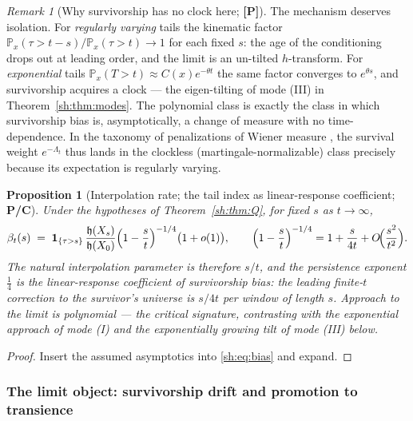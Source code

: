 \documentclass[11pt]{article}
\numberwithin{equation}{section}
\theoremstyle{plain}
\newtheorem{proposition}[theorem]{Proposition}
\theoremstyle{definition}
\theoremstyle{remark}
\newtheorem{remark}[theorem]{Remark}
\newcommand{\PP}{\mathbb{P}}
\newcommand{\one}{\mathbf{1}}
\newcommand{\hm}{\mathfrak{h}}
\begin{document}
\begin{remark}[Why survivorship has no clock here; \textbf{[P]}]
\label{sh:rem:noclock}
The mechanism deserves isolation. For \emph{regularly varying} tails the
kinematic factor $\PP_x(\tau>t-s)/\PP_x(\tau>t)\to1$ for each fixed $s$:
the age of the conditioning drops out at leading order, and the limit is
an un-tilted $h$-transform. For \emph{exponential} tails
$\PP_x(T>t)\approx C(x)e^{-\theta t}$ the same factor converges to
$e^{\theta s}$, and survivorship acquires a clock --- the eigen-tilting
of mode (III) in Theorem~\ref{sh:thm:modes}. The polynomial class is
exactly the class in which survivorship bias is, asymptotically, a
change of measure with no time-dependence. In the taxonomy of
penalizations of Wiener measure \cite{RVY06}, the survival weight
$e^{-\Lambda_t}$ thus lands in the clockless (martingale-normalizable)
class precisely because its expectation is regularly varying.
\end{remark}

\begin{proposition}[Interpolation rate; the tail index as linear-response
coefficient; \textbf{P/C}]\label{sh:prop:rate}
Under the hypotheses of Theorem~\ref{sh:thm:Q}, for fixed $s$ as
$t\to\infty$,
\begin{equation}\label{sh:eq:rate-interp}
\beta_t(s)\;=\;\one_{\{\tau>s\}}\,\frac{\hm(X_s)}{\hm(X_0)}
\Bigl(1-\frac st\Bigr)^{-1/4}\bigl(1+o(1)\bigr),
\qquad
\Bigl(1-\frac st\Bigr)^{-1/4}=1+\frac{s}{4t}+O\!\Bigl(\frac{s^2}{t^2}\Bigr).
\end{equation}
The natural interpolation parameter is therefore $s/t$, and the
persistence exponent $\tfrac14$ is the linear-response coefficient of
survivorship bias: the leading finite-$t$ correction to the survivor's
universe is $s/4t$ per window of length $s$. Approach to the limit is
polynomial --- the critical signature, contrasting with the exponential
approach of mode (I) and the exponentially growing tilt of mode (III)
below.
\end{proposition}

\begin{proof}
Insert the assumed asymptotics into \eqref{sh:eq:bias} and expand.
\end{proof}

\subsubsection{The limit object: survivorship drift and promotion to
transience}\label{sh:subsub:promotion}
\end{document}
